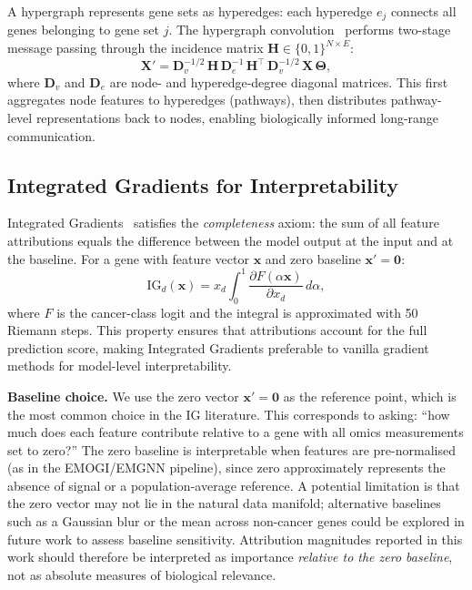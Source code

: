 A hypergraph represents gene sets as hyperedges: each hyperedge $e_j$ connects all genes
belonging to gene set $j$. The hypergraph convolution~\cite{hgnn2019} performs two-stage
message passing through the incidence matrix $\mathbf{H} \in \{0,1\}^{N \times E}$:
\begin{equation}
  \mathbf{X}' = \mathbf{D}_v^{-1/2}\,\mathbf{H}\,\mathbf{D}_e^{-1}\,\mathbf{H}^\top\,
  \mathbf{D}_v^{-1/2}\,\mathbf{X}\,\boldsymbol{\Theta},
  \label{eq:hypergnn}
\end{equation}
where $\mathbf{D}_v$ and $\mathbf{D}_e$ are node- and hyperedge-degree diagonal matrices.
This first aggregates node features to hyperedges (pathways), then distributes pathway-level
representations back to nodes, enabling biologically informed long-range communication.

\subsection{Integrated Gradients for Interpretability}

Integrated Gradients~\cite{ig2017} satisfies the \emph{completeness} axiom: the sum of
all feature attributions equals the difference between the model output at the input and
at the baseline. For a gene with feature vector $\mathbf{x}$ and zero baseline
$\mathbf{x}' = \mathbf{0}$:
\begin{equation}
  \text{IG}_d(\mathbf{x}) =
    x_d \int_0^1
    \frac{\partial F(\alpha\mathbf{x})}{\partial x_d} \, d\alpha,
  \label{eq:ig}
\end{equation}
where $F$ is the cancer-class logit and the integral is approximated with 50 Riemann
steps. This property ensures that attributions account for the full prediction score, making
Integrated Gradients preferable to vanilla gradient methods for model-level interpretability.

\textbf{Baseline choice.} We use the zero vector $\mathbf{x}' = \mathbf{0}$ as the
reference point, which is the most common choice in the IG literature. This corresponds to
asking: ``how much does each feature contribute relative to a gene with all omics
measurements set to zero?'' The zero baseline is interpretable when features are
pre-normalised (as in the EMOGI/EMGNN pipeline), since zero approximately represents the
absence of signal or a population-average reference. A potential limitation is that the
zero vector may not lie in the natural data manifold; alternative baselines such as a
Gaussian blur or the mean across non-cancer genes could be explored in future work to
assess baseline sensitivity. Attribution magnitudes reported in this work should therefore
be interpreted as importance \emph{relative to the zero baseline}, not as absolute measures
of biological relevance.

